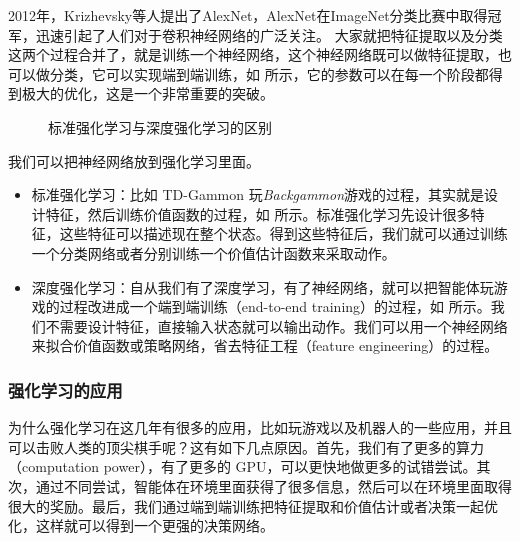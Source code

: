 2012年，Krizhevsky等人提出了AlexNet，AlexNet在ImageNet分类比赛中取得冠军，迅速引起了人们对于卷积神经网络的广泛关注。
大家就把特征提取以及分类这两个过程合并了，就是训练一个神经网络，这个神经网络既可以做特征提取，也可以做分类，它可以实现端到端训练，如 所示，它的参数可以在每一个阶段都得到极大的优化，这是一个非常重要的突破。

\begin{figure}[htb]
    \centering

    \caption{标准强化学习与深度强化学习的区别}
    \label{fig:cmp_rl}
\end{figure}

我们可以把神经网络放到强化学习里面。
\begin{itemize}
    \item 标准强化学习：比如 TD-Gammon 玩\textit{Backgammon}游戏的过程，其实就是设计特征，然后训练价值函数的过程，如 所示。标准强化学习先设计很多特征，这些特征可以描述现在整个状态。得到这些特征后，我们就可以通过训练一个分类网络或者分别训练一个价值估计函数来采取动作。
    \item 深度强化学习：自从我们有了深度学习，有了神经网络，就可以把智能体玩游戏的过程改进成一个端到端训练（end-to-end training）的过程，如 所示。我们不需要设计特征，直接输入状态就可以输出动作。我们可以用一个神经网络来拟合价值函数或策略网络，省去特征工程（feature engineering）的过程。
\end{itemize}

\subsubsection{强化学习的应用}
为什么强化学习在这几年有很多的应用，比如玩游戏以及机器人的一些应用，并且可以击败人类的顶尖棋手呢？这有如下几点原因。首先，我们有了更多的算力（computation power），有了更多的 GPU，可以更快地做更多的试错尝试。其次，通过不同尝试，智能体在环境里面获得了很多信息，然后可以在环境里面取得很大的奖励。最后，我们通过端到端训练把特征提取和价值估计或者决策一起优化，这样就可以得到一个更强的决策网络。

